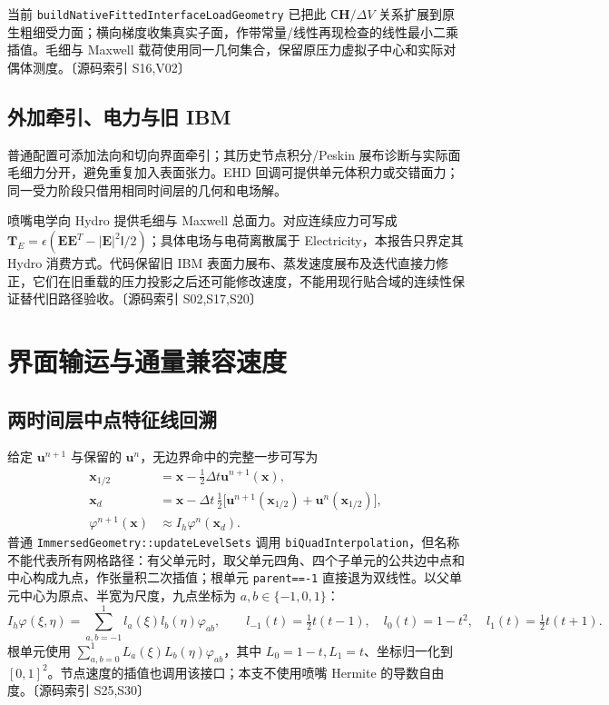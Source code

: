 \documentclass[UTF8,a4paper,11pt,fontset=fandol]{ctexart}
\newcommand{\code}[1]{\nolinkurl{#1}}
\newcommand{\src}[1]{\textcolor{ink}{\small〔源码索引 #1〕}}
\newcommand{\vel}{\bm{u}}
\newcommand{\dt}{\Delta t}
\newcommand{\mat}[1]{\mathsf{#1}}
\begin{document}
当前 \code{buildNativeFittedInterfaceLoadGeometry} 已把此 $\mat C\bm H/\Delta V$ 关系扩展到原生粗细受力面；横向梯度收集真实子面，作带常量/线性再现检查的线性最小二乘插值。毛细与 Maxwell 载荷使用同一几何集合，保留原压力虚拟子中心和实际对偶体测度。\src{S16,V02}

\subsection{外加牵引、电力与旧 IBM}
普通配置可添加法向和切向界面牵引；其历史节点积分/Peskin 展布诊断与实际面毛细力分开，避免重复加入表面张力。EHD 回调可提供单元体积力或交错面力；同一受力阶段只借用相同时间层的几何和电场解。

喷嘴电学向 Hydro 提供毛细与 Maxwell 总面力。对应连续应力可写成 $\bm T_E=\epsilon(\bm E\bm E^T-|\bm E|^2\mat I/2)$；具体电场与电荷离散属于 Electricity，本报告只界定其 Hydro 消费方式。代码保留旧 IBM 表面力展布、蒸发速度展布及迭代直接力修正，它们在旧重载的压力投影之后还可能修改速度，不能用现行贴合域的连续性保证替代旧路径验收。\src{S02,S17,S20}

\section{界面输运与通量兼容速度}
\subsection{两时间层中点特征线回溯}
给定 $\vel^{n+1}$ 与保留的 $\vel^n$，无边界命中的完整一步可写为
\begin{align}
 \bm x_{1/2}&=\bm x-\tfrac12\dt\vel^{n+1}(\bm x),\\
 \bm x_d&=\bm x-\dt\,
 \tfrac12\big[\vel^{n+1}(\bm x_{1/2})+\vel^n(\bm x_{1/2})\big],\\
 \varphi^{n+1}(\bm x)&\approx I_h\varphi^n(\bm x_d).\label{eq:trace}
\end{align}
普通 \code{ImmersedGeometry::updateLevelSets} 调用 \code{biQuadInterpolation}，但名称不能代表所有网格路径：有父单元时，取父单元四角、四个子单元的公共边中点和中心构成九点，作张量积二次插值；根单元 \code{parent==-1} 直接退为双线性。以父单元中心为原点、半宽为尺度，九点坐标为 $a,b\in\{-1,0,1\}$：
\begin{equation}
 I_h\varphi(\xi,\eta)=\sum_{a,b=-1}^{1}l_a(\xi)l_b(\eta)\varphi_{ab},\qquad
 l_{-1}(t)=\tfrac12t(t-1),\quad l_0(t)=1-t^2,\quad l_1(t)=\tfrac12t(t+1).
\end{equation}
根单元使用 $\sum_{a,b=0}^1 L_a(\xi)L_b(\eta)\varphi_{ab}$，其中 $L_0=1-t,L_1=t$、坐标归一化到 $[0,1]^2$。节点速度的插值也调用该接口；本支不使用喷嘴 Hermite 的导数自由度。\src{S25,S30}
\end{document}
